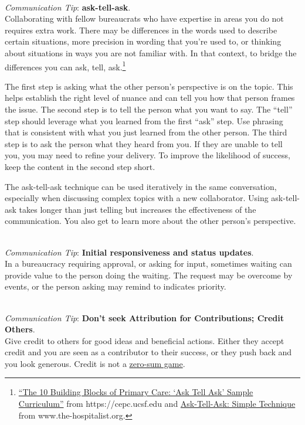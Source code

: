 \ \\
\textit{Communication Tip}: \textbf{ask-tell-ask}.\\
Collaborating with fellow bureaucrats who have expertise in areas you do not requires extra work. There may be differences in the words used to describe certain situations, more precision in wording that you're used to, or thinking about situations in ways you are not familiar with. In that context, to bridge the differences you can ask, tell, ask.\footnote{\href{https://cepc.ucsf.edu/sites/cepc.ucsf.edu/files/Curriculum_sample_14-0602.pdf}{``The 10 Building Blocks of Primary Care: `Ask Tell Ask' Sample Curriculum''} from https://cepc.ucsf.edu and \href{https://www.the-hospitalist.org/hospitalist/article/125126/qi-initiatives/ask-tell-ask-simple-technique-can-help-hospitalists}{Ask-Tell-Ask: Simple Technique} from www.the-hospitalist.org.} 

The first step is asking what the other person's perspective is on the topic. This helps establish the right level of nuance and can tell you how that person frames the issue. The second step is to tell the person what you want to say. The ``tell'' step should leverage what you learned from the first ``ask'' step. Use phrasing that is consistent with what you just learned from the other person. The third step is to ask the person what they heard from you. If they are unable to tell you, you may need to refine your delivery. To improve the likelihood of success, keep the content in the second step short. 

The ask-tell-ask technique can be used iteratively in the same conversation, especially when discussing complex topics with a new collaborator. 
Using ask-tell-ask takes longer than just telling but increases the effectiveness of the communication. You also get to learn more about the other person's perspective. 

\ \\
\textit{Communication Tip}: \textbf{Initial responsiveness and status updates}.\\
In a bureaucracy requiring approval, or asking for input, sometimes waiting can provide value to the person doing the waiting. The request may be overcome by events, or the person asking may remind to indicates priority.

\ \\
\textit{Communication Tip}: \textbf{Don't seek Attribution for Contributions; Credit Others\label{sec:credit-others}}.\\
Give credit to others for good ideas and beneficial actions. Either they accept credit and you are seen as a contributor to their success, or they push back and you look generous. Credit is not a \href{https://en.wikipedia.org/wiki/Zero-sum_game}{zero-sum game}.


